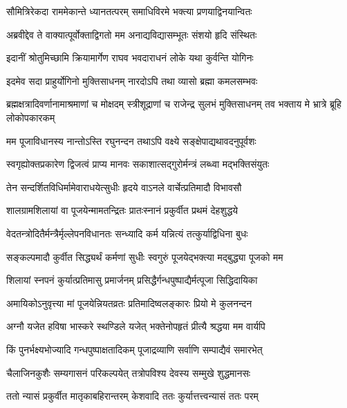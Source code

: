 \twolineshloka
{सौमित्रिरेकदा राममेकान्ते ध्यानतत्परम्}
{समाधिविरमे भक्त्या प्रणयाद्विनयान्वितः} %

\twolineshloka
{अब्रवीद्देव ते वाक्यात्पूर्वोक्ताद्विगतो मम}
{अनाद्यविद्यासम्भूतः संशयो हृदि संस्थितः} %

\twolineshloka
{इदानीं श्रोतुमिच्छामि क्रियामार्गेण राघव}
{भवदाराधनं लोके यथा कुर्वन्ति योगिनः} %

\twolineshloka
{इदमेव सदा प्राहुर्योगिनो मुक्तिसाधनम्}
{नारदोऽपि तथा व्यासो ब्रह्मा कमलसम्भवः} %

\threelineshloka
{ब्रह्मक्षत्रादिवर्णानामाश्रमाणां च मोक्षदम्}
{स्त्रीशूद्राणां च राजेन्द्र सुलभं मुक्तिसाधनम्}
{तव भक्ताय मे भ्रात्रे ब्रूहि लोकोपकारकम्} %


\twolineshloka
{मम पूजाविधानस्य नान्तोऽस्ति रघुनन्दन}
{तथाऽपि वक्ष्ये सङ्क्षेपाद्यथावदनुपूर्वशः} %

\twolineshloka
{स्वगृह्योक्तप्रकारेण द्विजत्वं प्राप्य मानवः}
{सकाशात्सद्गुरोर्मन्त्रं लब्ध्वा मद्भक्तिसंयुतः} %

\twolineshloka
{तेन सन्दर्शितविधिर्मामेवाराधयेत्सुधीः}
{हृदये वाऽनले वार्चेत्प्रतिमादौ विभावसौ} %

\twolineshloka
{शालग्रामशिलायां वा पूजयेन्मामतन्द्रितः}
{प्रातःस्नानं प्रकुर्वीत प्रथमं देहशुद्धये} %

\twolineshloka
{वेदतन्त्रोदितैर्मन्त्रैर्मृल्लेपनविधानतः}
{सन्ध्यादि कर्म यन्नित्यं तत्कुर्याद्विधिना बुधः} %

\twolineshloka
{सङ्कल्पमादौ कुर्वीत सिद्ध्यर्थं कर्मणां सुधीः}
{स्वगुरुं पूजयेद्भक्त्या मद्बुद्ध्या पूजको मम} %

\twolineshloka
{शिलायां स्नपनं कुर्यात्प्रतिमासु प्रमार्जनम्}
{प्रसिद्धैर्गन्धपुष्पाद्यैर्मत्पूजा सिद्धिदायिका} %

\twolineshloka
{अमायिकोऽनुवृत्त्या मां पूजयेन्नियतव्रतः}
{प्रतिमादिष्वलङ्कारः प्रियो मे कुलनन्दन} %

\twolineshloka
{अग्नौ यजेत हविषा भास्करे स्थण्डिले यजेत्}
{भक्तेनोपहृतं प्रीत्यै श्रद्धया मम वार्यपि} %

\twolineshloka
{किं पुनर्भक्ष्यभोज्यादि गन्धपुष्पाक्षतादिकम्}
{पूजाद्रव्याणि सर्वाणि सम्पाद्यैवं समारभेत्} %

\twolineshloka
{चैलाजिनकुशैः सम्यगासनं परिकल्पयेत्}
{तत्रोपविश्य देवस्य सम्मुखे शुद्धमानसः} %

\twolineshloka
{ततो न्यासं प्रकुर्वीत मातृकाबहिरान्तरम्}
{केशवादि ततः कुर्यात्तत्त्वन्यासं ततः परम्} %

